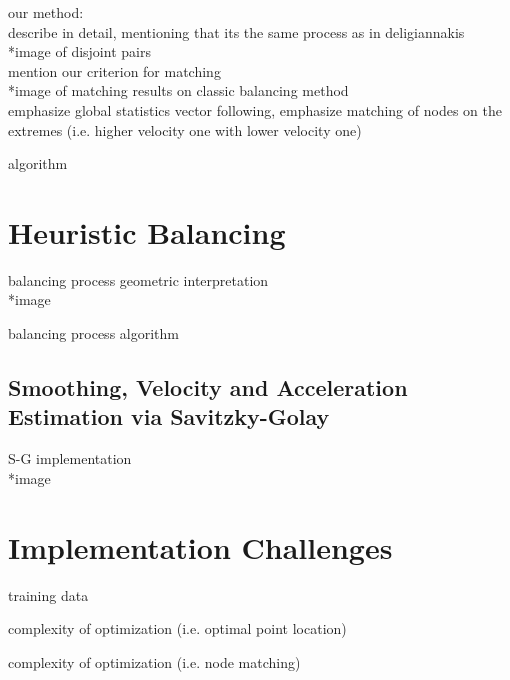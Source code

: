 our method:\\
describe in detail, mentioning that its the same process as in deligiannakis\\
*image of disjoint pairs\\
mention our criterion for matching\\
*image of matching results on classic balancing method\\
emphasize global statistics vector following, emphasize matching of nodes on the extremes (i.e. higher velocity one with lower velocity one)

algorithm\\

\section{Heuristic Balancing} \label{sec:impl-heuristic}

balancing process geometric interpretation\\
*image

balancing process algorithm

\subsection{Smoothing, Velocity and Acceleration Estimation via Savitzky-Golay} \label{subsec:impl-heuristic-vel}

S-G implementation\\
*image

\section{Implementation Challenges} \label{sec:impl-implChallenges}

training data

complexity of optimization (i.e. optimal point location)

complexity of optimization (i.e. node matching)